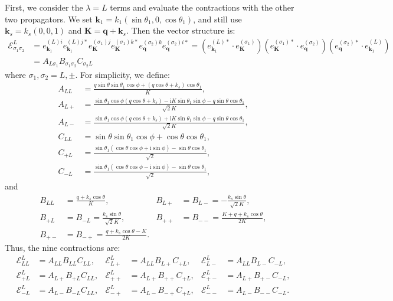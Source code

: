 \documentclass[a4paper,12pt]{article}
\def\mb{\mathbf}
\def\ii{\mathrm{i}}
\def\si{\sigma}
\begin{document}
First, we consider the $\lambda=L$ terms and evaluate the contractions with the other two propagators. We set
$\mb k_1=k_1(\sin\theta_1,0,\cos\theta_1)$, and still use $\mb k_s=k_s(0,0,1)$ and
$\mb K=\mb q+\mb k_s$. Then the vector structure is:
\begin{align}
    \mathcal{E}_{\si_1\si_2}^L& = e^{(L)i}_{\mb k_1} e^{(L)j*}_{\mb k_1}
    e^{(\si_1)j}_{\mb K}e^{(\si_1)k*}_{\mb K}
    e^{(\si_2)k}_{\mb q}e^{(\si_2)i*}_{\mb q}
    =
    (e^{(L)*}_{\mb k_1}\cdot e^{(\si_1)}_{\mb K})
    (e^{(\si_1)*}_{\mb K}\cdot e^{(\si_2)}_{\mb q})
    (e^{(\si_2)*}_{\mb q}\cdot e^{(L)}_{\mb k_1}) \nonumber \\
    &= A_{L\si_1} B_{\si_1 \si_2} C_{\si_2 L}
\end{align}
where $\si_1,\si_2=L,\pm$. For simplicity, we define:
\begin{align}
    A_{LL} &= \frac{q\sin\theta\sin\theta_1\cos\phi+(q\cos\theta+k_s)\cos\theta_1}{K}, \\
    A_{L+} &= \frac{\sin\theta_1\cos\phi(q\cos\theta+k_s)-\ii K\sin\theta_1\sin\phi-q\sin\theta\cos\theta_1}{\sqrt{2}K}, \\
    A_{L-} &= \frac{\sin\theta_1\cos\phi(q\cos\theta+k_s)+\ii K\sin\theta_1\sin\phi-q\sin\theta\cos\theta_1}{\sqrt{2}K}, \\
    C_{LL} &= \sin\theta\sin\theta_1\cos\phi+\cos\theta\cos\theta_1, \\
    C_{+L} &= \frac{\sin\theta_1(\cos\theta\cos\phi+\ii\sin\phi)-\sin\theta\cos\theta_1}{\sqrt{2}}, \\
    C_{-L} &= \frac{\sin\theta_1(\cos\theta\cos\phi-\ii\sin\phi)-\sin\theta\cos\theta_1}{\sqrt{2}},
\end{align}
and
\begin{align}
    B_{LL} &= \frac{q+k_s\cos\theta}{K}, &
    B_{L+}&=B_{L-} = -\frac{k_s\sin\theta}{\sqrt{2}K}, \\
    B_{+L}&=B_{-L} = \frac{k_s\sin\theta}{\sqrt{2}K}, &
    B_{++}&=B_{--} = \frac{K+q+k_s\cos\theta}{2K}, \\
    B_{+-}&=B_{-+} = \frac{q+k_s\cos\theta-K}{2K}.
\end{align}
Thus, the nine contractions are:
\begin{align}
    \mathcal{E}_{LL}^L &= A_{LL} B_{LL} C_{LL}, &
    \mathcal{E}_{L+}^L &= A_{LL} B_{L+} C_{+L}, &
    \mathcal{E}_{L-}^L &= A_{LL} B_{L-} C_{-L}, \\
    \mathcal{E}_{+L}^L &= A_{L+} B_{+L} C_{LL}, &
    \mathcal{E}_{++}^L &= A_{L+} B_{++} C_{+L}, &
    \mathcal{E}_{+-}^L &= A_{L+} B_{+-} C_{-L}, \\
    \mathcal{E}_{-L}^L &= A_{L-} B_{-L} C_{LL}, &
    \mathcal{E}_{-+}^L &= A_{L-} B_{-+} C_{+L}, &
    \mathcal{E}_{--}^L &= A_{L-} B_{--} C_{-L}.
\end{align}
\end{document}
